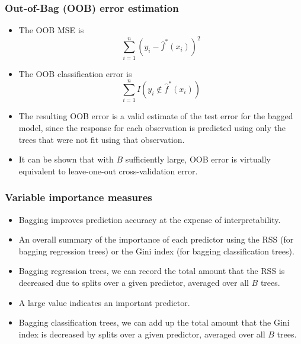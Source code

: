 \documentclass{beamer}
\begin{document}
                       \begin{frame}
                       	\frametitle{Out-of-Bag (OOB) error estimation  }
                       	\begin{itemize}
                       		\item  The OOB MSE is
                       		$$ \sum_{i=1}^n (y_i - \hat f^*(x_i))^2$$
                       		
                       		\item The OOB classification error is 
                       		$$ \sum_{i=1}^n I(y_i \notin \hat f^*(x_i))$$
                       		
                       		\item The resulting OOB error is a valid
                       		estimate of the test error for the bagged model, since the response for each
                       		observation is predicted using only the trees that were not fit using that
                       		observation.
                       	 
                       	  \item	It can
                       		be shown that with $B$ sufficiently large, OOB error is virtually equivalent
                       		to leave-one-out cross-validation error.
                       		
                       	\end{itemize}
                       \end{frame} 
                  
                  \begin{frame}
                  	\frametitle{Variable importance measures  }
                  	\begin{itemize}
                  		\item Bagging improves prediction
                  		accuracy at the expense of interpretability.
                  	 	
                  	 	 
                  		\item  An overall summary of the importance of
                  		each predictor using the RSS (for bagging regression trees) or the Gini index
                  		(for bagging classification trees).
                  		\item Bagging regression trees, we
                  		can record the total amount that the RSS   is decreased due to splits
                  		over a given predictor, averaged over all $B$ trees.
                  		\item  A large value indicates
                  		an important predictor.
                  		\item Bagging classification
                  		trees, we can add up the total amount that the Gini index   is decreased
                  		by splits over a given predictor, averaged over all $B$ trees.
                  		
                  	\end{itemize}
                  \end{frame} 
              
\end{document}
